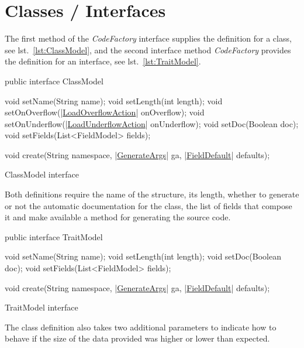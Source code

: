 \documentclass[a4paper,10pt]{report}
\newenvironment{elisting}[1][H]
  {\captionsetup{aboveskip=0pt}\begin{listing}[#1]}
  {\end{listing}%
}
\begin{document}
\section{Classes / Interfaces}
The first method of the \textsl{CodeFactory} interface supplies the definition 
for a class, see lst.~\ref{lst:ClassModel}, and the second interface method 
\textsl{CodeFactory} provides the definition for an interface, see 
lst.~\ref{lst:TraitModel}.

\begin{elisting}[!htb]
\begin{javacode}
public interface ClassModel {
    void setName(String name);
    void setLength(int length);
    void setOnOverflow(|\hyperref[lst:LoadOverflowAction]{LoadOverflowAction}| onOverflow);
    void setOnUnderflow(|\hyperref[lst:LoadUnderflowAction]{LoadUnderflowAction}| onUnderflow);
    void setDoc(Boolean doc);
    void setFields(List<FieldModel> fields);

    void create(String namespace, |\hyperref[lst:GenerateArgs]{GenerateArgs}| ga, |\hyperref[lst:FieldDefault]{FieldDefault}| defaults);
}
\end{javacode}
\caption{ClassModel interface}
\label{lst:ClassModel}
\end{elisting}

Both definitions require the name of the structure, its length, whether to 
generate or not the automatic documentation for the class, the list of fields 
that compose it and make available a method for generating the source code.

\begin{elisting}[!htb]
\begin{javacode}
public interface TraitModel {
    void setName(String name);
    void setLength(int length);
    void setDoc(Boolean doc);
    void setFields(List<FieldModel> fields);

    void create(String namespace, |\hyperref[lst:GenerateArgs]{GenerateArgs}| ga, |\hyperref[lst:FieldDefault]{FieldDefault}| defaults);
}
\end{javacode}
\caption{TraitModel interface}
\label{lst:TraitModel}
\end{elisting}
The class definition also takes two additional parameters to indicate how to 
behave if the size of the data provided was higher or lower than expected.
\end{document}
